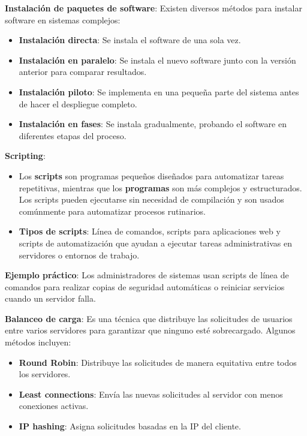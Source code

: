 \documentclass[a4paper,11pt]{article}
\begin{document}
\textbf{Instalación de paquetes de software}: Existen diversos métodos para instalar software en sistemas complejos:
\begin{itemize}
    \item \textbf{Instalación directa}: Se instala el software de una sola vez.
    \item \textbf{Instalación en paralelo}: Se instala el nuevo software junto con la versión anterior para comparar resultados.
    \item \textbf{Instalación piloto}: Se implementa en una pequeña parte del sistema antes de hacer el despliegue completo.
    \item \textbf{Instalación en fases}: Se instala gradualmente, probando el software en diferentes etapas del proceso.
\end{itemize}

\textbf{Scripting}: 
\begin{itemize}
    \item Los \textbf{scripts} son programas pequeños diseñados para automatizar tareas repetitivas, mientras que los \textbf{programas} son más complejos y estructurados. Los scripts pueden ejecutarse sin necesidad de compilación y son usados comúnmente para automatizar procesos rutinarios.
    \item \textbf{Tipos de scripts}: Línea de comandos, scripts para aplicaciones web y scripts de automatización que ayudan a ejecutar tareas administrativas en servidores o entornos de trabajo.
\end{itemize}

\textbf{Ejemplo práctico}: Los administradores de sistemas usan scripts de línea de comandos para realizar copias de seguridad automáticas o reiniciar servicios cuando un servidor falla.

\textbf{Balanceo de carga}: Es una técnica que distribuye las solicitudes de usuarios entre varios servidores para garantizar que ninguno esté sobrecargado. Algunos métodos incluyen:
\begin{itemize}
    \item \textbf{Round Robin}: Distribuye las solicitudes de manera equitativa entre todos los servidores.
    \item \textbf{Least connections}: Envía las nuevas solicitudes al servidor con menos conexiones activas.
    \item \textbf{IP hashing}: Asigna solicitudes basadas en la IP del cliente.
\end{itemize}
\end{document}
